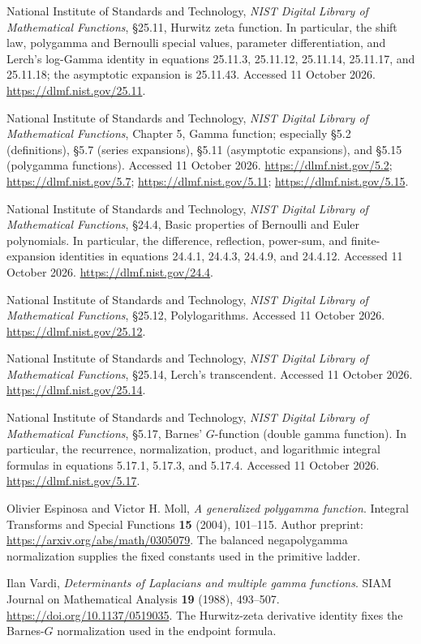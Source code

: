 National Institute of Standards and Technology,
\emph{NIST Digital Library of Mathematical Functions},
\S25.11, Hurwitz zeta function.
In particular, the shift law, polygamma and Bernoulli special values, parameter
differentiation, and Lerch's log-Gamma identity in
equations 25.11.3, 25.11.12, 25.11.14, 25.11.17, and 25.11.18;
the asymptotic expansion is 25.11.43.
Accessed 11 October 2026.
\url{https://dlmf.nist.gov/25.11}.

National Institute of Standards and Technology,
\emph{NIST Digital Library of Mathematical Functions},
Chapter 5, Gamma function; especially \S5.2 (definitions),
\S5.7 (series expansions), \S5.11 (asymptotic expansions),
and \S5.15 (polygamma functions).
Accessed 11 October 2026.
\url{https://dlmf.nist.gov/5.2};
\url{https://dlmf.nist.gov/5.7};
\url{https://dlmf.nist.gov/5.11};
\url{https://dlmf.nist.gov/5.15}.

National Institute of Standards and Technology,
\emph{NIST Digital Library of Mathematical Functions},
\S24.4, Basic properties of Bernoulli and Euler polynomials.
In particular, the difference, reflection, power-sum, and finite-expansion
identities in equations 24.4.1, 24.4.3, 24.4.9, and 24.4.12.
Accessed 11 October 2026.
\url{https://dlmf.nist.gov/24.4}.

National Institute of Standards and Technology,
\emph{NIST Digital Library of Mathematical Functions},
\S25.12, Polylogarithms.
Accessed 11 October 2026.
\url{https://dlmf.nist.gov/25.12}.

National Institute of Standards and Technology,
\emph{NIST Digital Library of Mathematical Functions},
\S25.14, Lerch's transcendent.
Accessed 11 October 2026.
\url{https://dlmf.nist.gov/25.14}.

National Institute of Standards and Technology,
\emph{NIST Digital Library of Mathematical Functions},
\S5.17, Barnes' $G$-function (double gamma function).
In particular, the recurrence, normalization, product, and logarithmic
integral formulas in equations 5.17.1, 5.17.3, and 5.17.4.
Accessed 11 October 2026.
\url{https://dlmf.nist.gov/5.17}.

Olivier Espinosa and Victor H. Moll,
\emph{A generalized polygamma function}.
Integral Transforms and Special Functions \textbf{15} (2004), 101--115.
Author preprint: \url{https://arxiv.org/abs/math/0305079}.
The balanced negapolygamma normalization supplies the fixed constants
used in the primitive ladder.

Ilan Vardi,
\emph{Determinants of Laplacians and multiple gamma functions}.
SIAM Journal on Mathematical Analysis \textbf{19} (1988), 493--507.
\url{https://doi.org/10.1137/0519035}.
The Hurwitz-zeta derivative identity fixes the Barnes-$G$ normalization
used in the endpoint formula.

